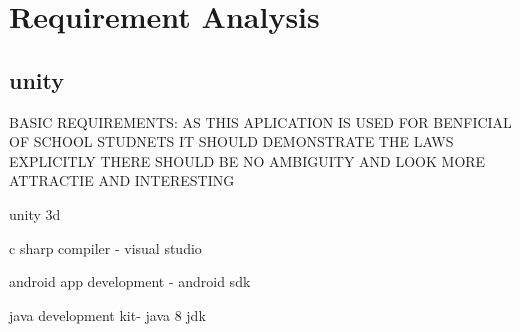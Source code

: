 \chapter{Requirement Analysis}
\section{unity}
BASIC REQUIREMENTS: AS THIS APLICATION IS USED FOR BENFICIAL OF SCHOOL STUDNETS IT SHOULD DEMONSTRATE THE LAWS EXPLICITLY
THERE SHOULD BE NO AMBIGUITY
AND LOOK MORE ATTRACTIE AND INTERESTING

unity 3d

c sharp compiler - visual studio

android app development - android sdk

java development kit- java 8 jdk